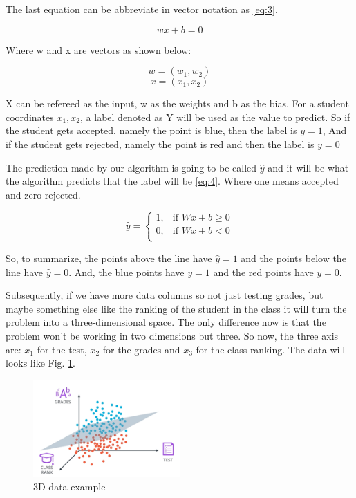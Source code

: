 \documentclass{article}
\begin{document}
The last equation can be abbreviate in vector notation as \eqref{eq:3}.

\begin{equation}
wx+b=0 \label{eq:3}
\end{equation}  

Where w and x are vectors as shown below:

\[ w = (w_1, w_2)\]
\[ x = (x_1, x_2)\]

X can be refereed as the input, w as the weights and b as the bias. For a student coordinates \(x_1, x_2\), a label denoted as Y will be used as the value to predict. So if the student gets accepted, namely the point is blue,
then the label is \( y = 1\), And if the student gets rejected, namely the point is red and then the label is \( y = 0\)

The prediction made by our algorithm is going to be called \(\hat{y}\) and it will be what the algorithm predicts that the label will be \eqref{eq:4}. Where one means accepted and zero rejected.

\begin{equation}
\label{eq:4}
\hat{y} =
  \begin{cases}
    1, & \text{if } Wx + b \geq 0 \\
    0, & \text{if } Wx + b < 0 \\
  \end{cases}
\end{equation}  

So, to summarize, the points above the line have \( \hat{y} = 1\) and the points below the line have \( \hat{y} = 0\). And, the blue points have \( y = 1\) and the red points have \( y = 0\).

Subsequently, if we have more data columns so not just testing grades, but maybe something else like the ranking of the student in the class it will turn the problem into a three-dimensional space. The only difference now is that the problem won't be working in two dimensions but three. So now, the three axis are: \(x_1\) for the test, \(x_2\) for the grades and \(x_3\) for the class ranking. The data will looks like Fig. \ref{fig:f4}.

\begin{figure}[ht]
    \centering
    \includegraphics[width=0.5\textwidth,height=0.5\textheight,keepaspectratio]{images/example_2.PNG}
    \captionsetup{justification=centering}
    \caption{3D data example}
    \label{fig:f4}
\end{figure}
\end{document}
